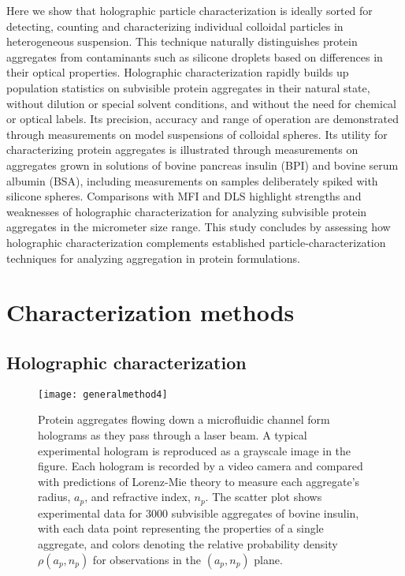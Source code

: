 Here we show that holographic particle characterization is ideally sorted for detecting, counting
and characterizing individual colloidal particles in heterogeneous suspension. This technique naturally distinguishes protein aggregates from contaminants such as silicone droplets based on differences in their optical properties. Holographic characterization
rapidly builds up population statistics on subvisible protein aggregates
in their natural state, without dilution or special solvent conditions, and without the need for chemical or optical labels.
Its precision, accuracy and range of operation are demonstrated through measurements on model suspensions of colloidal spheres. Its utility for characterizing protein aggregates is illustrated through measurements on aggregates grown in solutions of bovine pancreas insulin (BPI) and bovine serum albumin (BSA), including measurements on samples deliberately spiked with silicone spheres. Comparisons with MFI and DLS highlight strengths and weaknesses of holographic characterization for analyzing subvisible protein aggregates in the micrometer size range. This study concludes by assessing how holographic characterization complements established particle-characterization techniques for analyzing aggregation in protein formulations.

\section{Characterization methods}
\label{sec:methods}

\subsection{Holographic characterization}
\label{sec:characterization}

\begin{figure}[!t]
  \centering
  \texttt{[image: generalmethod4]}
  \caption[Bovine insulin distribution]{Protein aggregates flowing down a microfluidic
    channel form holograms as they pass through a laser beam.
    A typical experimental hologram is reproduced as a grayscale image
    in the figure.
    Each hologram is recorded by a video camera and
    compared with predictions of Lorenz-Mie theory to
    measure each aggregate's radius, $a_p$, and refractive index, $n_p$.
    The scatter plot shows experimental data for \num{3000}
    subvisible aggregates of bovine insulin, with each data point
    representing the properties of a single aggregate, and colors
    denoting the relative probability density $\rho(a_p,n_p)$ for
    observations in the $(a_p,n_p)$ plane.}
  \label{fig:hologram}
\end{figure}

